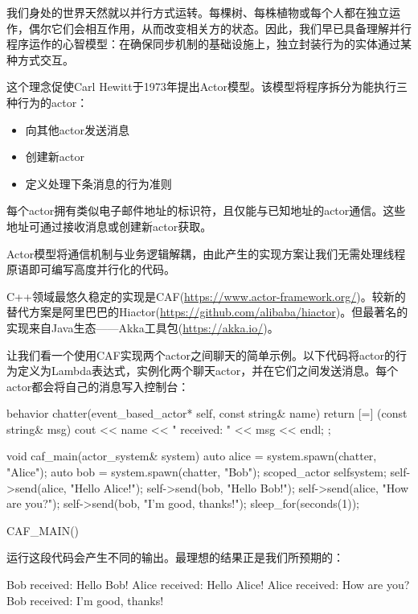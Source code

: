
我们身处的世界天然就以并行方式运转。每棵树、每株植物或每个人都在独立运作，偶尔它们会相互作用，从而改变相关方的状态。因此，我们早已具备理解并行程序运作的心智模型：在确保同步机制的基础设施上，独立封装行为的实体通过某种方式交互。

这个理念促使Carl Hewitt于1973年提出Actor模型。该模型将程序拆分为能执行三种行为的actor：

\begin{itemize}
\item 
向其他actor发送消息

\item 
创建新actor

\item 
定义处理下条消息的行为准则
\end{itemize}

每个actor拥有类似电子邮件地址的标识符，且仅能与已知地址的actor通信。这些地址可通过接收消息或创建新actor获取。

Actor模型将通信机制与业务逻辑解耦，由此产生的实现方案让我们无需处理线程原语即可编写高度并行化的代码。

C++领域最悠久稳定的实现是CAF(\url{https://www.actor-framework.org/})。较新的替代方案是阿里巴巴的Hiactor(\url{https://github.com/alibaba/hiactor})。但最著名的实现来自Java生态——Akka工具包(\url{https://akka.io/})。

让我们看一个使用CAF实现两个actor之间聊天的简单示例。以下代码将actor的行为定义为Lambda表达式，实例化两个聊天actor，并在它们之间发送消息。每个actor都会将自己的消息写入控制台：

\begin{cpp}
behavior chatter(event_based_actor* self, const string& name) {
  return {
    [=] (const string& msg) {
      cout << name << " received: " << msg << endl;
    }
  };
}

void caf_main(actor_system& system) {
  auto alice = system.spawn(chatter, "Alice");
  auto bob = system.spawn(chatter, "Bob");
  scoped_actor self{system};
  self->send(alice, "Hello Alice!");
  self->send(bob, "Hello Bob!");
  self->send(alice, "How are you?");
  self->send(bob, "I'm good, thanks!");
  sleep_for(seconds(1));
}

CAF_MAIN()
\end{cpp}

运行这段代码会产生不同的输出。最理想的结果正是我们所预期的：

\begin{shell}
Bob received: Hello Bob!
Alice received: Hello Alice!
Alice received: How are you?
Bob received: I'm good, thanks!
\end{shell}

